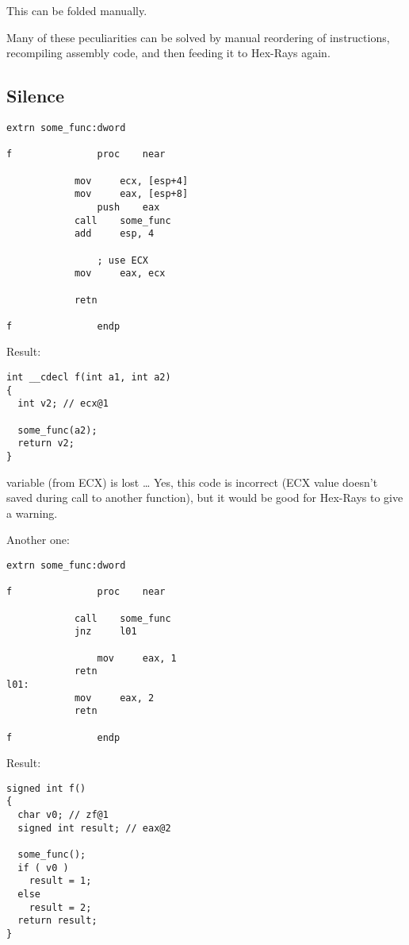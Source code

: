 This can be folded manually.

Many of these peculiarities can be solved by manual reordering of instructions, recompiling assembly code,
and then feeding it to Hex-Rays again.

\subsection{Silence}

\begin{lstlisting}
extrn some_func:dword

f               proc    near

        	mov     ecx, [esp+4]
	        mov     eax, [esp+8]
                push    eax
        	call    some_func
	        add     esp, 4

                ; use ECX
        	mov     eax, ecx

	        retn

f               endp
\end{lstlisting}

Result:

\begin{lstlisting}
int __cdecl f(int a1, int a2)
{
  int v2; // ecx@1

  some_func(a2);
  return v2;
}
\end{lstlisting}

 variable (from ECX) is lost \dots
Yes, this code is incorrect (ECX value doesn't saved during call to another function),
but it would be good for Hex-Rays to give a warning.

Another one:

\begin{lstlisting}
extrn some_func:dword

f               proc    near

	        call    some_func
        	jnz     l01

                mov     eax, 1
	        retn
l01:
	        mov     eax, 2
        	retn

f               endp
\end{lstlisting}

Result:

\begin{lstlisting}
signed int f()
{
  char v0; // zf@1
  signed int result; // eax@2

  some_func();
  if ( v0 )
    result = 1;
  else
    result = 2;
  return result;
}
\end{lstlisting}

